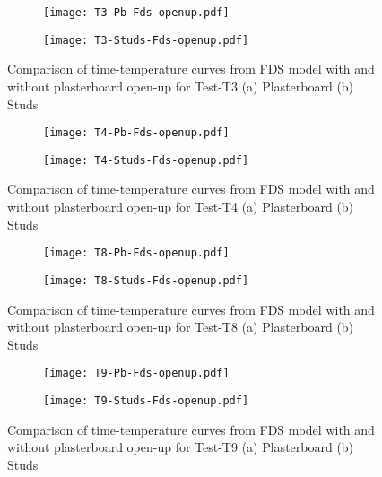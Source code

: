 \begin{figure}[!htbp]
	\centering
	\begin{subfigure}[b]{0.7\textwidth}
		\centering
		\texttt{[image: T3-Pb-Fds-openup.pdf]}
		\caption{}
		\label{subfig:T3-Pb-Fds-openup}
	\end{subfigure}
	\begin{subfigure}[b]{0.6\textwidth}
		\centering
		\texttt{[image: T3-Studs-Fds-openup.pdf]}
		\caption{}
		\label{subfig:T3-Studs-Fds-openup}
	\end{subfigure}
	   \caption{Comparison of time-temperature curves from FDS model with and without plasterboard open-up for Test-T3 (a) Plasterboard (b) Studs}
	   \label{fig:T3-model-comparison-Fds-openup}
\end{figure}
\begin{figure}[!htbp]
	\centering
	\begin{subfigure}[b]{0.7\textwidth}
		\centering
		\texttt{[image: T4-Pb-Fds-openup.pdf]}
		\caption{}
		\label{subfig:T4-Pb-Fds-openup}
	\end{subfigure}
	\begin{subfigure}[b]{0.6\textwidth}
		\centering
		\texttt{[image: T4-Studs-Fds-openup.pdf]}
		\caption{}
		\label{subfig:T4-Studs-Fds-openup}
	\end{subfigure}
	   \caption{Comparison of time-temperature curves from FDS model with and without plasterboard open-up for Test-T4 (a) Plasterboard (b) Studs}
	   \label{fig:T4-model-comparison-Fds-openup}
\end{figure}
\begin{figure}[!htbp]
	\centering
	\begin{subfigure}[b]{0.7\textwidth}
		\centering
		\texttt{[image: T8-Pb-Fds-openup.pdf]}
		\caption{}
		\label{subfig:T8-Pb-Fds-openup}
	\end{subfigure}
	\begin{subfigure}[b]{0.6\textwidth}
		\centering
		\texttt{[image: T8-Studs-Fds-openup.pdf]}
		\caption{}
		\label{subfig:T8-Studs-Fds-openup}
	\end{subfigure}
	   \caption{Comparison of time-temperature curves from FDS model with and without plasterboard open-up for Test-T8 (a) Plasterboard (b) Studs}
	   \label{fig:T8-model-comparison-Fds-openup}
\end{figure}
\begin{figure}[!htbp]
	\centering
	\begin{subfigure}[b]{0.7\textwidth}
		\centering
		\texttt{[image: T9-Pb-Fds-openup.pdf]}
		\caption{}
		\label{subfig:T9-Pb-Fds-openup}
	\end{subfigure}
	\begin{subfigure}[b]{0.6\textwidth}
		\centering
		\texttt{[image: T9-Studs-Fds-openup.pdf]}
		\caption{}
		\label{subfig:T9-Studs-Fds-openup}
	\end{subfigure}
	   \caption{Comparison of time-temperature curves from FDS model with and without plasterboard open-up for Test-T9 (a) Plasterboard (b) Studs}
	   \label{fig:T9-model-comparison-Fds-openup}
\end{figure}

